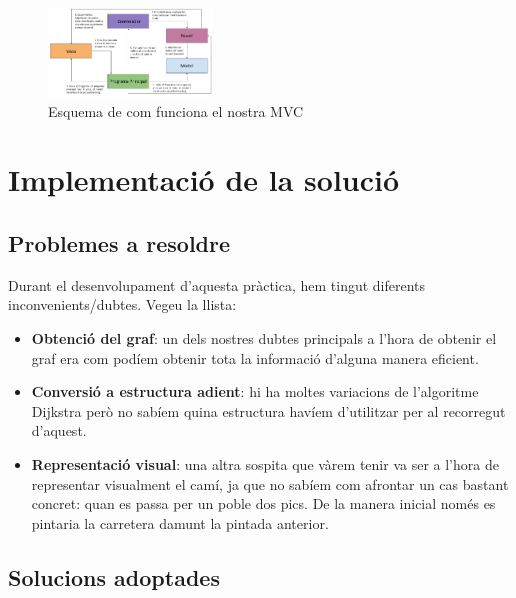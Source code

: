 \documentclass[conference]{IEEEtran}
\begin{document}
\begin{figure}[ht]
    \centering
    \includegraphics[width=0.388\textwidth]{images/MVC.png}
    \caption{Esquema de com funciona el nostra MVC}
\end{figure}

\section{Implementació de la solució}

\subsection{Problemes a resoldre}
    Durant el desenvolupament d'aquesta pràctica, hem tingut diferents inconvenients/dubtes. Vegeu la llista:

    \begin{itemize}
        \item \textbf{Obtenció del graf}: un dels nostres dubtes principals a l'hora de obtenir el graf era com podíem obtenir tota la informació d'alguna manera eficient.
        \item \textbf{Conversió a estructura adient}: hi ha moltes variacions de l'algoritme Dijkstra però no sabíem quina estructura havíem d'utilitzar per al recorregut d'aquest.
        \item \textbf{Representació visual}: una altra sospita que vàrem tenir va ser a l'hora de representar visualment el camí, ja que no sabíem com afrontar un cas bastant concret: quan es passa per un poble dos pics. De la manera inicial només es pintaria la carretera damunt la pintada anterior.
        \\
    \end{itemize}
    \subsection{Solucions adoptades}
\end{document}
